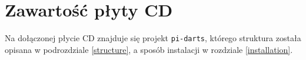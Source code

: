 \chapter{Zawartość płyty CD}
\thispagestyle{chapterBeginStyle}
\label{plytaCD}

Na dołączonej płycie CD znajduje się projekt \verb|pi-darts|, którego struktura została opisana w podrozdziale \ref{structure}, a sposób instalacji w rozdziale \ref{installation}.

